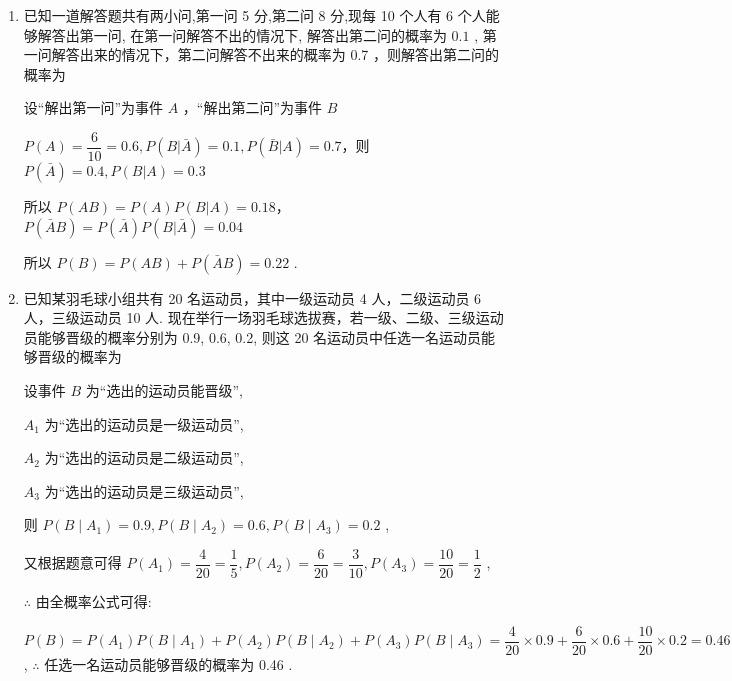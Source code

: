\begin{enumerate}
\begin{enumerate}
        \item 已知一道解答题共有两小问,第一问 5 分,第二问 8 分,现每 10 个人有 6 个人能够解答出第一问, 在第一问解答不出的情况下, 解答出第二问的概率为 $0.1$ , 第一问解答出来的情况下，第二问解答不出来的概率为 0.7 ，则解答出第二问的概率为
        \begin{jieda}
            设“解出第一问”为事件 $A$ ，“解出第二问”为事件 $B$
            
            $P\left( A\right)  = \dfrac{6}{10} = {0.6},P\left( {B|\bar{A}}\right)  = {0.1},P\left( {\bar{B}|A}\right)  = {0.7}$，则 $P\left( \bar{A}\right)  = {0.4},P\left( {B|A}\right)  = {0.3}$
            
            所以 $P\left( {AB}\right)  = P\left( A\right) P\left( {B|A}\right)  = {0.18}$，$P\left( {\bar{A}B}\right)  = P\left( \bar{A}\right) P\left( {B|\bar{A}}\right)  = {0.04}$
            
            所以 $P\left( B\right)  = P\left( {AB}\right)  + P\left( {\bar{A}B}\right)  = {0.22}$ .
        \end{jieda}
        
        \item 已知某羽毛球小组共有 20 名运动员，其中一级运动员 4 人，二级运动员 6 人，三级运动员 10 人. 现在举行一场羽毛球选拔赛，若一级、二级、三级运动员能够晋级的概率分别为 0.9, 0.6, 0.2, 则这 20 名运动员中任选一名运动员能够晋级的概率为
        \begin{jieda}
            设事件 $B$ 为“选出的运动员能晋级”,
            
            ${A}_{1}$ 为“选出的运动员是一级运动员”,
            
            ${A}_{2}$ 为“选出的运动员是二级运动员”,
            
            ${A}_{3}$ 为“选出的运动员是三级运动员”,
            
            则 $P\left( {B \mid  {A}_{1}}\right)  = {0.9},P\left( {B \mid  {A}_{2}}\right)  = {0.6},P\left( {B \mid  {A}_{3}}\right)  = {0.2}$ ,
            
            又根据题意可得 $P\left( {A}_{1}\right)  = \dfrac{4}{20} = \dfrac{1}{5},P\left( {A}_{2}\right)  = \dfrac{6}{20} = \dfrac{3}{10},P\left( {A}_{3}\right)  = \dfrac{10}{20} = \dfrac{1}{2}$ ,
            
            $\therefore$ 由全概率公式可得:
            
            $P\left( B\right)  = P\left( {A}_{1}\right) P\left( {B \mid  {A}_{1}}\right)  + P\left( {A}_{2}\right) P\left( {B \mid  {A}_{2}}\right)  + P\left( {A}_{3}\right) P\left( {B \mid  {A}_{3}}\right)  = \dfrac{4}{20} \times  {0.9} + \dfrac{6}{20} \times  {0.6} + \dfrac{10}{20} \times  {0.2} = {0.46}$ , $\therefore$ 任选一名运动员能够晋级的概率为 0.46 .
        \end{jieda}
        

\end{enumerate}
\end{enumerate}
